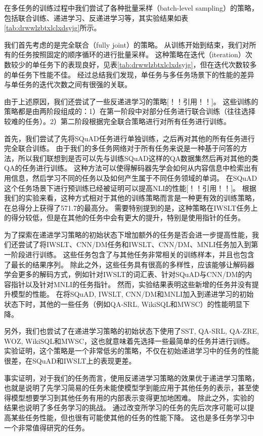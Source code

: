 在多任务的训练过程中我们尝试了各种批量采样（batch-level sampling）的策略，包括联合训练、递进学习、反递进学习等，其实验结果如表\ref{tab:drwwlzbtxlclxdsyjg}所示。

我们首先考虑的是完全联合（fully joint）的策略。
从训练开始到结束，我们对所有的任务按照固定的顺序循环的进行批量采样。
这种策略在迭代（iteration）次数较少的单任务下的表现良好，见表\ref{tab:drwwlzbtxlclxdsyjg}，但在迭代次数较多的单任务下性能不佳。
经过总结我们发现，单任务与多任务场景下的性能的差异与单任务的迭代次数之间有很强的关联。

由于上述原因，我们还尝试了一些反递进学习的策略[！！引用！！]。
这些训练的策略都是由两阶段组成的：1）在第一阶段中对部分任务进行联合训练（往往选择较难的任务）。2）第二阶段根据完全联合策略进行对所有任务进行训练。

首先，我们尝试了先将SQuAD任务进行单独训练，之后再对其他的所有任务进行完全联合训练。
由于我们的多任务网络对于所有任务来说是一种基于问答的方法，所以我们联想到是否可以先与训练SQuAD这样的QA数据集然后再对其他的类QA的任务进行训练。
这种方法可以使得解码器先学会如何从内容信息中检索出有用信息，然后学习不同的任务以及如何产生属于不同任务领域的单词。
在SQuAD这个任务场景下进行预训练已经被证明可以提高NLI的性能[！！引用！！]。
根据我们的实验来看，这种方式相对于其他的训练策略而言是一种更有效的训练策略，在总得分上获得了571.7的最高分。
需要特别提到的是，这种策略在IWSLT任务上的得分较低，但是在其他的任务中会有更大的提升，特别是使用指针的任务。

为了探索在递进学习策略的初始状态下增加额外的任务是否会进一步提高性能，我们还尝试了将IWSLT、CNN/DM任务和IWSLT、CNN/DM、MNLI任务加入到第一阶段进行训练。
这些任务包含了与其他任务非常相关的训练样本，并且也包含了最长的结果序列。
除此之外，这些任务具有很高的多样性，应该能够让解码器学会更多的解码方式，例如针对IWSLT的词汇表、针对SQuAD与CNN/DM的内容指针以及针对MNLI的任务指针。
然而，实验结果表明这些新增的任务并没有提升模型的性能。
在将SQuAD, IWSLT, CNN/DM和MNLI加入到递进学习的初始状态下时，其他的一些任务（例如QA-SRL, WikiSQL和MWSC）的性能明显下降。

另外，我们也尝试了在递进学习策略的初始状态下使用了SST, QA-SRL, QA-ZRE, WOZ, WikiSQL和MWSC，这也就意味着先选择一些最简单的任务并进行训练。
实验证明，这个策略是一个非常低劣的策略，不仅在初始递进学习中的任务的性能很差，在SQuAD和IWSLT上的表现更差。

事实证明，对于我们的任务而言，使用反递进学习策略的效果优于递进学习策略，也就是说明了先学习简易的任务未能使模型学到能应用于其他任务的表示，甚至使得模型想要学习到其他任务有用的内部表示变得更加地困难。
除此之外，实验的结果也说明了多任务学习的挑战。
通过改变所学习的任务的先后次序可能可以提高某些任务性能，但也很有可能使其他的任务的性能下降。
这也是多任务学习中一个非常值得研究的任务。


